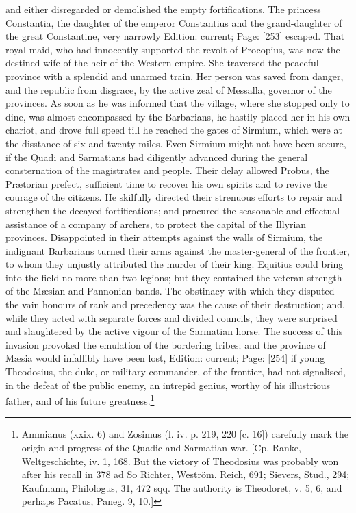 and either disregarded or demolished the empty fortifications. The princess Constantia, the daughter of the emperor Constantius and the grand-daughter of the great Constantine, very narrowly Edition: current; Page: [253] escaped. That royal maid, who had innocently supported the revolt of Procopius, was now the destined wife of the heir of the Western empire. She traversed the peaceful province with a splendid and unarmed train. Her person was saved from danger, and the republic from disgrace, by the active zeal of Messalla, governor of the provinces. As soon as he was informed that the village, where she stopped only to dine, was almost encompassed by the Barbarians, he hastily placed her in his own chariot, and drove full speed till he reached the gates of Sirmium, which were at the disstance of six and twenty miles. Even Sirmium might not have been secure, if the Quadi and Sarmatians had diligently advanced during the general consternation of the magistrates and people. Their delay allowed Probus, the Prætorian prefect, sufficient time to recover his own spirits and to revive the courage of the citizens. He skilfully directed their strenuous efforts to repair and strengthen the decayed fortifications; and procured the seasonable and effectual assistance of a company of archers, to protect the capital of the Illyrian provinces. Disappointed in their attempts against the walls of Sirmium, the indignant Barbarians turned their arms against the master-general of the frontier, to whom they unjustly attributed the murder of their king. Equitius could bring into the field no more than two legions; but they contained the veteran strength of the Mæsian and Pannonian bands. The obstinacy with which they disputed the vain honours of rank and precedency was the cause of their destruction; and, while they acted with separate forces and divided councils, they were surprised and slaughtered by the active vigour of the Sarmatian horse. The success of this invasion provoked the emulation of the bordering tribes; and the province of Mæsia would infallibly have been lost, Edition: current; Page: [254] if young Theodosius, the duke, or military commander, of the frontier, had not signalised, in the defeat of the public enemy, an intrepid genius, worthy of his illustrious father, and of his future greatness.\footnote{Ammianus (xxix. 6) and Zosimus (l. iv. p. 219, 220 [c. 16]) carefully mark the origin and progress of the Quadic and Sarmatian war. [Cp. Ranke, Weltgeschichte, iv. 1, 168. But the victory of Theodosius was probably won after his recall in 378 ad So Richter, Weström. Reich, 691; Sievers, Stud., 294; Kaufmann, Philologus, 31, 472 sqq. The authority is Theodoret, v. 5, 6, and perhaps Pacatus, Paneg. 9, 10.]}

